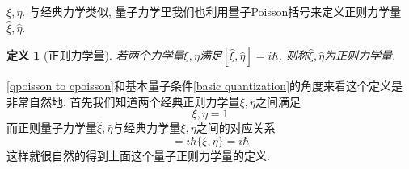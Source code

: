 \documentclass[a4paper,11pt]{book}
\newtheorem{definition}{\hspace{2em}定义}[section]
\begin{document}
$\xi,\eta$. 与经典力学类似, 量子力学里我们也利用量子Poisson括号来定义正则力学量$\hat{\xi},\hat{\eta}$.
\begin{definition}[正则力学量]
  若两个力学量$\xi,\eta$满足$[\hat{\xi},\hat{\eta}]=i\hbar$, 则称$\hat{\xi},\hat{\eta}$为正则力学量.
\end{definition}
\eqref{qpoisson to cpoisson}和基本量子条件\eqref{basic quantization}的角度来看这个定义是非常自然地. 首先我们知道两个经典正则力学量$\xi,\eta$之间满足
\begin{equation*}
  {\xi,\eta}=1
\end{equation*}
而正则量子力学量$\hat{\xi},\hat{\eta}$与经典力学量$\xi,\eta$之间的对应关系
\begin{equation*}
  [\hat{\xi},\hat{\eta}]=i\hbar\{\xi,\eta\}=i\hbar
\end{equation*}
这样就很自然的得到上面这个量子正则力学量的定义.
\end{document}
